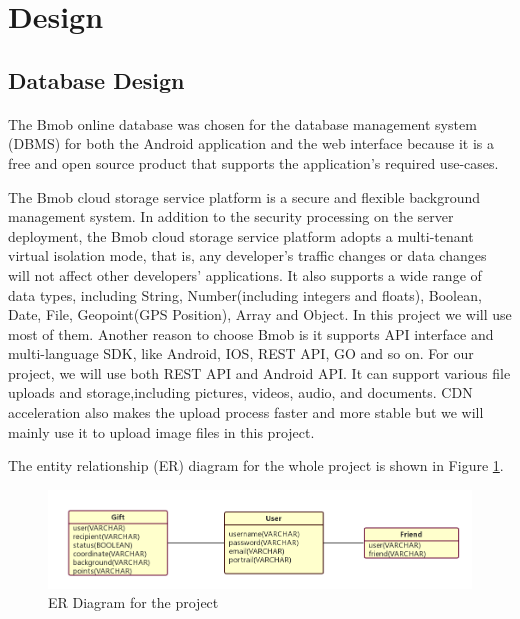 \section{Design}
\label{sec:Design}

\subsection{Database Design} 
\paragraph{}The Bmob online database was chosen for the database management system (DBMS) for both the Android application and the web interface because it is a free and open source product that supports the application's required use-cases. 
\par The Bmob cloud storage service platform is a secure and flexible background management system. In addition to the security processing on the server deployment, the Bmob cloud storage service platform adopts a multi-tenant virtual isolation mode, that is, any developer's traffic changes or data changes will not affect other developers' applications. It also supports a wide range of data types, including String, Number(including integers and floats), Boolean, Date, File, Geopoint(GPS Position), Array and Object. In this project we will use most of them.
Another reason to choose Bmob is it supports API interface and multi-language SDK, like Android, IOS, REST API, GO and so on. For our project, we will use both REST API and Android API. It can support various file uploads and storage,including pictures, videos, audio, and documents. CDN acceleration also makes the upload process faster and more stable but we will mainly use it to upload image files in this project. 
\par The entity relationship (ER) diagram for the whole project is shown in Figure \ref{ERDiagram}.

\begin{figure}[htb]
\centering
\includegraphics[width=.9\textwidth]{section03/assets/ERDiagram.png}
\caption[Short Caption 2]{\label{ERDiagram}ER Diagram for the project}
\end{figure}

